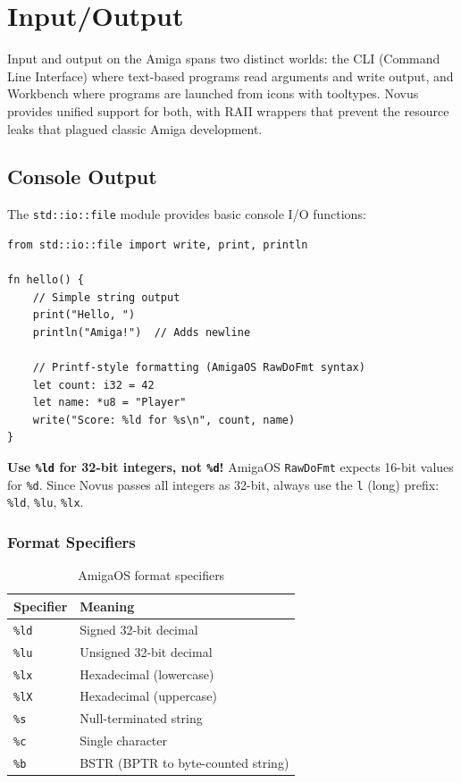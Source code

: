 \chapter{Input/Output}
\label{chap:io}

Input and output on the Amiga spans two distinct worlds: the CLI (Command Line Interface) where text-based programs read arguments and write output, and Workbench where programs are launched from icons with tooltypes. Novus provides unified support for both, with RAII wrappers that prevent the resource leaks that plagued classic Amiga development.

\section{Console Output}
\label{sec:console-output}

The \texttt{std::io::file} module provides basic console I/O functions:

\begin{lstlisting}
from std::io::file import write, print, println

fn hello() {
    // Simple string output
    print("Hello, ")
    println("Amiga!")  // Adds newline

    // Printf-style formatting (AmigaOS RawDoFmt syntax)
    let count: i32 = 42
    let name: *u8 = "Player"
    write("Score: %ld for %s\n", count, name)
}
\end{lstlisting}

\begin{warningbox}
\textbf{Use \texttt{\%ld} for 32-bit integers, not \texttt{\%d}!} AmigaOS \texttt{RawDoFmt} expects 16-bit values for \texttt{\%d}. Since Novus passes all integers as 32-bit, always use the \texttt{l} (long) prefix: \texttt{\%ld}, \texttt{\%lu}, \texttt{\%lx}.
\end{warningbox}

\subsection{Format Specifiers}

\begin{table}[h]
\centering
\begin{tabular}{ll}
\textbf{Specifier} & \textbf{Meaning} \\
\hline
\texttt{\%ld} & Signed 32-bit decimal \\
\texttt{\%lu} & Unsigned 32-bit decimal \\
\texttt{\%lx} & Hexadecimal (lowercase) \\
\texttt{\%lX} & Hexadecimal (uppercase) \\
\texttt{\%s} & Null-terminated string \\
\texttt{\%c} & Single character \\
\texttt{\%b} & BSTR (BPTR to byte-counted string) \\
\end{tabular}
\caption{AmigaOS format specifiers}
\end{table}

